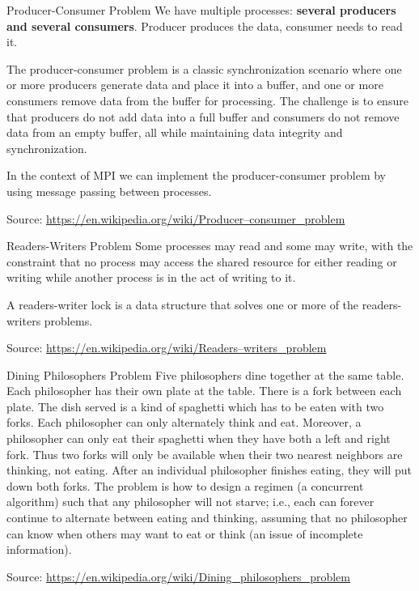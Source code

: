 \documentclass{beamer}
\begin{document}
\begin{frame}{Producer-Consumer Problem}
  We have multiple processes: \textbf{several producers and several consumers}.
  Producer produces the data, consumer needs to read it.

  The producer-consumer problem is a classic synchronization scenario where one or more producers generate data and place it into a buffer, and one or more consumers remove data from the buffer for processing. The challenge is to ensure that producers do not add data into a full buffer and consumers do not remove data from an empty buffer, all while maintaining data integrity and synchronization.

  In the context of MPI we can implement the producer-consumer problem by using message passing between processes.

  Source: \href{https://en.wikipedia.org/wiki/Producer–consumer_problem}{https://en.wikipedia.org/wiki/Producer–consumer\_problem}
\end{frame}

\begin{frame}{Readers-Writers Problem}
  Some processes may read and some may write, with the constraint that no process may access the shared resource for either reading or writing while another process is in the act of writing to it.

  A readers-writer lock is a data structure that solves one or more of the readers-writers problems.

  Source: \href{https://en.wikipedia.org/wiki/Readers–writers_problem}{https://en.wikipedia.org/wiki/Readers–writers\_problem}
\end{frame}

\begin{frame}{Dining Philosophers Problem}
  Five philosophers dine together at the same table. Each philosopher has their own plate at the table. There is a fork between each plate. The dish served is a kind of spaghetti which has to be eaten with two forks. Each philosopher can only alternately think and eat. Moreover, a philosopher can only eat their spaghetti when they have both a left and right fork. Thus two forks will only be available when their two nearest neighbors are thinking, not eating. After an individual philosopher finishes eating, they will put down both forks. The problem is how to design a regimen (a concurrent algorithm) such that any philosopher will not starve; i.e., each can forever continue to alternate between eating and thinking, assuming that no philosopher can know when others may want to eat or think (an issue of incomplete information).

  Source: \href{https://en.wikipedia.org/wiki/Dining_philosophers_problem}{https://en.wikipedia.org/wiki/Dining\_philosophers\_problem}
\end{frame}
\end{document}
